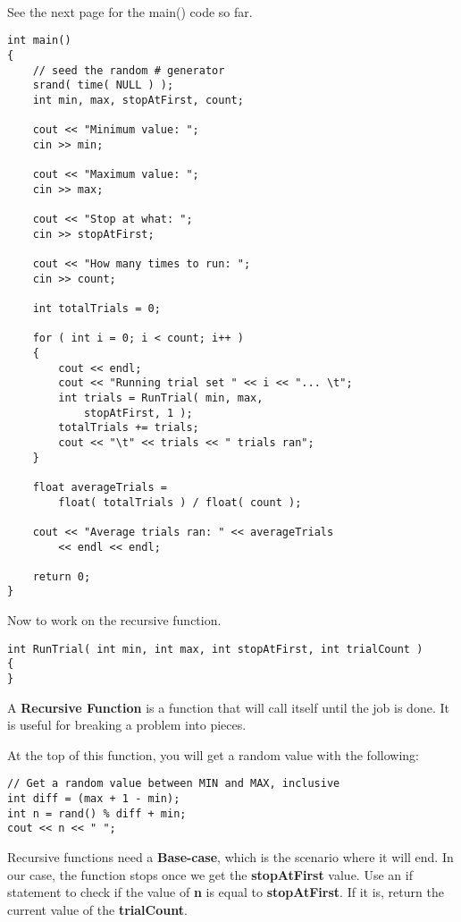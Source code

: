 \documentclass[a4paper,12pt]{book}
\begin{document}
    ~\\

    See the next page for the main() code so far.


\newpage
\begin{lstlisting}[style=code]
int main()
{
    // seed the random # generator
    srand( time( NULL ) );  
    int min, max, stopAtFirst, count;
    
    cout << "Minimum value: ";
    cin >> min;

    cout << "Maximum value: ";
    cin >> max;

    cout << "Stop at what: ";
    cin >> stopAtFirst;
    
    cout << "How many times to run: ";
    cin >> count;

    int totalTrials = 0;

    for ( int i = 0; i < count; i++ )
    {
        cout << endl;
        cout << "Running trial set " << i << "... \t";
        int trials = RunTrial( min, max,
            stopAtFirst, 1 );
        totalTrials += trials;
        cout << "\t" << trials << " trials ran";
    }
    
    float averageTrials =
        float( totalTrials ) / float( count );
        
    cout << "Average trials ran: " << averageTrials
        << endl << endl;
    
    return 0;
}
\end{lstlisting}

    \newpage

    Now to work on the recursive function.
    
\begin{verbatim}
int RunTrial( int min, int max, int stopAtFirst, int trialCount )
{
}
\end{verbatim}

    A \textbf{Recursive Function} is a function that will call itself
    until the job is done. It is useful for breaking a problem into pieces.

    At the top of this function, you will get a random value with the following:

\begin{verbatim}
// Get a random value between MIN and MAX, inclusive
int diff = (max + 1 - min);
int n = rand() % diff + min;
cout << n << " ";
\end{verbatim}

    Recursive functions need a \textbf{Base-case}, which is the scenario
    where it will end. In our case, the function stops once we get
    the \textbf{stopAtFirst} value.
    Use an if statement to check if the value of \textbf{n} is equal
    to \textbf{stopAtFirst}. If it is, return the current value of the
    \textbf{trialCount}.
\end{document}
